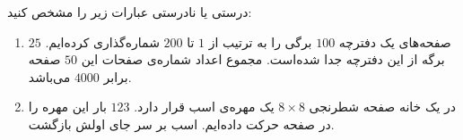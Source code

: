 \EXERCISE
درستی یا نادرستی عبارات زیر را مشخص کنید:
\begin{enumerate}
\item
صفحه‌های یک دفترچه
$100$
برگی را به ترتیب از
$1$
تا
$200$
شماره‌گذاری کرده‌ایم.
$25$
برگه از این دفترچه جدا شده‌است. مجموع اعداد شماره‌ی صفحات این
$50$
صفحه برابر
$4000$
می‌باشد.
\item
در یک خانه صفحه شطرنجی
$8 \times 8$
یک مهره‌ی اسب قرار دارد.
$123$
بار این مهره را در صفحه حرکت داده‌ایم. اسب بر سر جای اولش بازگشت.
\end{enumerate}